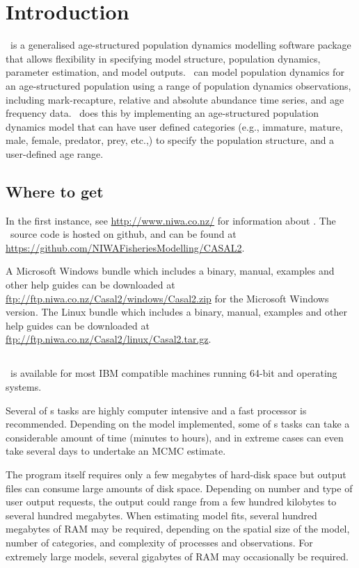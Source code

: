 \section{Introduction\label{sec:Introduction}}

\CNAME\ is a generalised age-structured population dynamics modelling software package that allows flexibility in specifying model structure, population dynamics, parameter estimation, and model outputs. \CNAME\ can model population dynamics for an age-structured population using a range of population dynamics observations, including mark-recapture, relative and absolute abundance time series, and age frequency data. \CNAME\ does this by implementing an age-structured population dynamics model that can have user defined categories (e.g., immature, mature, male, female, predator, prey, etc.,) to specify the population structure, and a user-defined age range. 

\subsection{Where to get \CNAME }

In the first instance, see \url{http://www.niwa.co.nz/} for information about \CNAME . The \CNAME\ source code is hosted on github, and can be found at \url{https://github.com/NIWAFisheriesModelling/CASAL2}.

A Microsoft Windows bundle which includes a binary, manual, examples and other help guides can be downloaded at \url{ftp://ftp.niwa.co.nz/Casal2/windows/Casal2.zip} for the Microsoft Windows version. The Linux bundle which includes a binary, manual, examples and other help guides can be downloaded at \url{ftp://ftp.niwa.co.nz/Casal2/linux/Casal2.tar.gz}.

\subsection{}

\CNAME\ is available for most IBM compatible machines running 64-bit  and  operating systems.

Several of \CNAME s tasks are highly computer intensive and a fast processor is recommended. Depending on the model implemented, some of \CNAME s tasks can take a considerable amount of time (minutes to hours), and in extreme cases can even take several days to undertake an MCMC estimate. 

The program itself requires only a few megabytes of hard-disk space but output files can consume large amounts of disk space. Depending on number and type of user output requests, the output could range from a few hundred kilobytes to several hundred megabytes. When estimating model fits, several hundred megabytes of RAM may be required, depending on the spatial size of the model, number of categories, and complexity of processes and observations. For extremely large models, several gigabytes of RAM may occasionally be required. 

